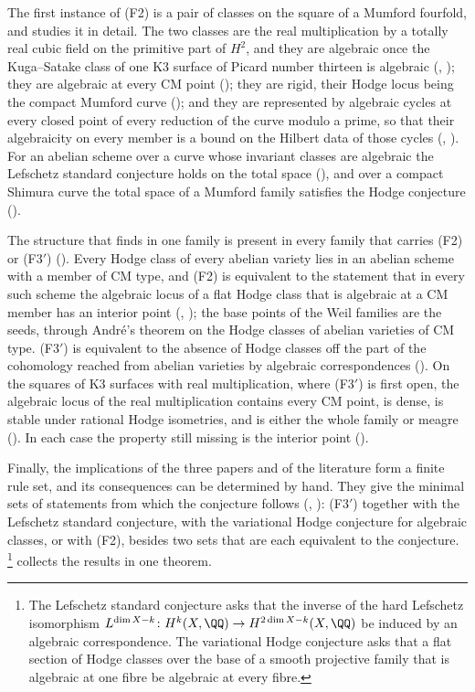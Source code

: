 The first instance of (F2) is a pair of classes on the square of a Mumford
fourfold, and  studies it in detail. The two classes are
the real multiplication by a totally real cubic field on the primitive part of
$H^{2}$, and they are algebraic once the Kuga--Satake class of one K3 surface
of Picard number thirteen is algebraic (,
); they are algebraic at every CM point
(); they are rigid, their Hodge locus being the compact
Mumford curve (); and they are represented by
algebraic cycles at every closed point of every reduction of the curve modulo
a prime, so that their algebraicity on every member is a bound on the Hilbert
data of those cycles (, ). For an
abelian scheme over a curve whose invariant classes are algebraic the
Lefschetz standard conjecture holds on the total space
(), and over a compact Shimura curve the total space
of a Mumford family satisfies the Hodge conjecture
().

The structure that \cite[Theorem~1.1]{paperI} finds in one family is present in every
family that carries (F2) or (F3$'$) (). Every Hodge class
of every abelian variety lies in an abelian scheme with a member of CM type,
and (F2) is equivalent to the statement that in every such scheme the
algebraic locus of a flat Hodge class that is algebraic at a CM member has an
interior point (, ); the base
points of the Weil families are the seeds, through Andr\'e's theorem on the
Hodge classes of abelian varieties of CM type. (F3$'$) is equivalent to the
absence of Hodge classes off the part of the cohomology reached from abelian
varieties by algebraic correspondences (). On the squares of
K3 surfaces with real multiplication, where (F3$'$) is first open, the
algebraic locus of the real multiplication contains every CM point, is dense,
is stable under rational Hodge isometries, and is either the whole family or
meagre (). In each case the property still missing is the
interior point ().


Finally, the implications of the three papers and of the literature form a
finite rule set, and its consequences can be determined by hand. They give
the minimal sets of statements from which the conjecture follows
(, ): (F3$'$) together with the
Lefschetz standard conjecture, with the variational Hodge conjecture for
algebraic classes, or with (F2), besides two sets that are each equivalent to
the conjecture.%
\footnote{The Lefschetz standard conjecture asks that the inverse of the
hard Lefschetz isomorphism $L^{\dim X-k}\colon H^{k}(X,\QQ)\to
H^{2\dim X-k}(X,\QQ)$ be induced by an algebraic correspondence. The
variational Hodge conjecture asks that a flat section of Hodge classes over
the base of a smooth projective family that is algebraic at one fibre be
algebraic at every fibre.}
 collects the results in one theorem.

